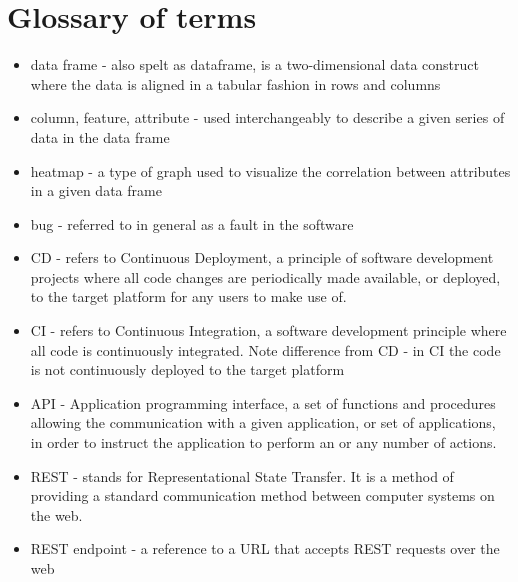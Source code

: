 \section{Glossary of terms}
\begin{itemize}
    \item data frame - also spelt as dataframe, is a two-dimensional data construct where the data is aligned in a tabular fashion in rows and columns
    \item column, feature, attribute - used interchangeably to describe a given series of data in the data frame
    \item heatmap - a type of graph used to visualize the correlation between attributes in a given data frame
    \item bug - referred to in general as a fault in the software
    \item CD - refers to Continuous Deployment, a principle of software development projects where all code changes are periodically made available, or deployed, to the target platform for any users to make use of. 
    \item CI - refers to Continuous Integration, a software development principle where all code is continuously integrated. Note difference from CD - in CI the code is not continuously deployed to the target platform
    \item API - Application programming interface, a set of functions and procedures allowing the communication with a given application, or set of applications, in order to instruct the application to perform an or any number of actions.
    \item REST - stands for Representational State Transfer. It is a method of providing a standard communication method between computer systems on the web.
    \item REST endpoint - a reference to a URL that accepts REST requests over the web
\end{itemize}